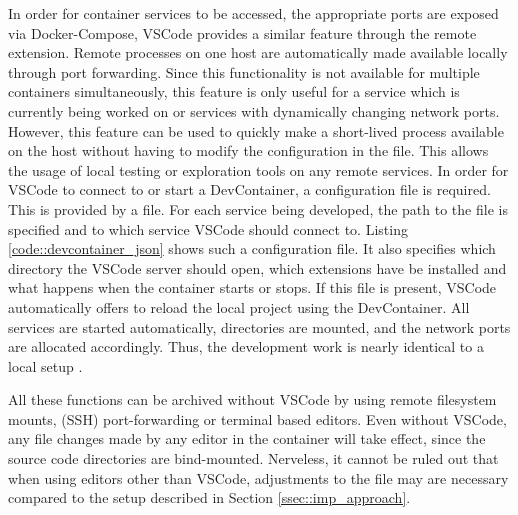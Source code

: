         In order for container services to be accessed, the appropriate ports are exposed via Docker-Compose, \ac{VSCode} provides a similar feature through the remote extension. Remote processes on one host are automatically made available locally through port forwarding. Since this functionality is not available for multiple containers simultaneously, this feature is only useful for a service which is currently being worked on or services with dynamically changing network ports. However, this feature can be used to quickly make a short-lived process available on the host without having to modify the configuration in the  file. This allows the usage of local testing or exploration tools on any remote services.\newline
        In order for \ac{VSCode} to connect to or start a DevContainer, a configuration file is required. This is provided by a  file. For each service being developed, the path to the  file is specified and to which service \ac{VSCode} should connect to. Listing \ref{code::devcontainer_json} shows such a configuration file. It also specifies which directory the \ac{VSCode} server should open, which extensions have be installed and what happens when the container starts or stops. If this file is present, \ac{VSCode} automatically offers to reload the local project using the DevContainer. All services are started automatically, directories are mounted, and the network ports are allocated accordingly. Thus, the development work is nearly identical to a local setup \cite{vscodedevcontainer}.\newline
        
        All these functions can be archived without \ac{VSCode} by using remote filesystem mounts, (\ac{SSH}) port-forwarding or terminal based editors. Even without VSCode, any file changes made by any editor in the container will take effect, since the source code directories are bind-mounted. Nerveless, it cannot be ruled out that when using editors other than \ac{VSCode}, adjustments to the  file may are necessary compared to the setup described in Section \ref{ssec::imp_approach}.

